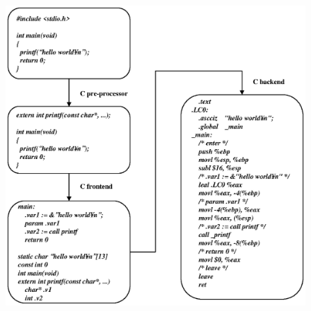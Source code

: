 \label{front_back_e000}

\begin{figure}[htbp]
\begin{center}
\begin{latexonly}
\includegraphics[width=1.2\linewidth,height=1.2\linewidth]{front_back_e.eps}
\end{latexonly}
\begin{htmlonly}

\end{htmlonly}
\end{center}
\end{figure}
